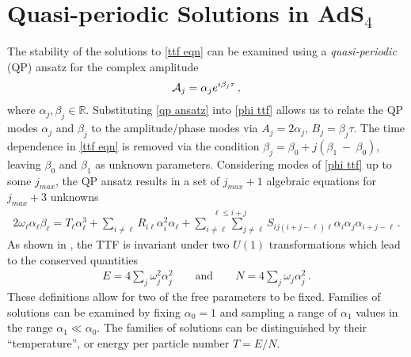 \documentclass[../PhD.tex]{subfiles}
\begin{document}

\section{Quasi-periodic Solutions in AdS$_4$}
\label{sec: qp}

The stability of the solutions to \eqref{ttf eqn} can be examined using a \emph{quasi-periodic} (QP) ansatz for the complex amplitude
\begin{align}
\label{qp ansatz}
\mathcal A_j = \alpha_j e^{i \beta_j \tau} \, ,
\end{align}
where $\alpha_j, \beta_j \in \mathbb{R}$. Substituting \eqref{qp ansatz} into \eqref{phi ttf} allows us to relate the QP modes $\alpha_j$ and $\beta_j$ to the amplitude/phase modes via $A_j = 2 \alpha_j$, $B_j = \beta_j \tau$. The time dependence in \eqref{ttf eqn} is removed via the condition $\beta_j = \beta_0 + j(\beta_1~-~\beta_0)$, leaving $\beta_0$ and $\beta_1$ as unknown parameters. Considering modes of \eqref{phi ttf} up to some $j_{max}$, the QP ansatz results in a set of $j_{max} + 1$ algebraic equations for $j_{max} + 3$ unknowns
\begin{align}
\label{qp eqn}
2 \omega_\ell \alpha_\ell \beta_\ell = T_\ell \alpha_\ell^3 + \sum_{i \neq \ell} R_{i\ell} \alpha_i^2 \alpha_\ell + \stackrel{\ell \leq i + j}{\sum_{i \neq \ell} \sum_{j \neq \ell}} S_{ij(i+j-\ell)\ell} \alpha_i \alpha_j \alpha_{i+j-\ell} \, .
\end{align}
As shown in \cite{1507.08261, 1510.07836}, the TTF is invariant under two $U(1)$ transformations which lead to the conserved quantities
\begin{align}
\label{qp cons}
E = 4\sum_j \omega^2_j \alpha_j^2 \qquad \text{and} \qquad N= 4 \sum_j \omega_j \alpha_j^2 \, .
\end{align}
These definitions allow for two of the free parameters to be fixed. Families of solutions can be examined by fixing $\alpha_0 = 1$ and sampling a range of $\alpha_1$ values in the range $\alpha_1 \ll \alpha_0$. The families of solutions can be distinguished by their ``temperature'', or energy per particle number $T=E/N$. 
\end{document}
